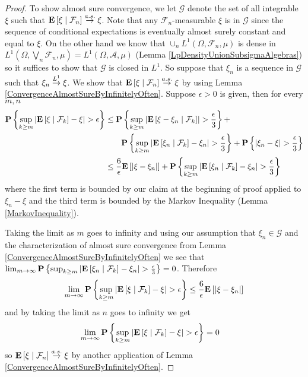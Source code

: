 \begin{proof}
To show almost sure convergence, we let $\mathcal{G}$ denote the set
of all integrable $\xi$ such that
$\cexpectationlong{\mathcal{F}_n}{\xi} \toas \xi$.  Note that any
$\mathcal{F}_n$-measurable $\xi$ is in $\mathcal{G}$ since the sequence
of conditional expectations is eventually almost surely constant and
equal to $\xi$.  On the other hand we know that $\cup_n
L^1(\Omega, \mathcal{F}_n, \mu)$ is dense in $L^1(\Omega, \bigvee_n
  \mathcal{F}_n, \mu) = L^1(\Omega, \mathcal{A}, \mu)$ (Lemma
  \ref{LpDensityUnionSubsigmaAlgebras}) so it suffices to show that
  $\mathcal{G}$ is closed in $L^1$.  So suppose that $\xi_n$ is a
  sequence in $\mathcal{G}$ such that $\xi_n \tolp{1} \xi$.  We show
  that $\cexpectationlong{\mathcal{F}_n}{\xi} \toas \xi$ by using
  Lemma \ref{ConvergenceAlmostSureByInfinitelyOften}.  Suppose
  $\epsilon > 0$ is given, then for every $m,n$
\begin{align*}\begin{split}
\probability{\sup_{k \geq m} \abs{\cexpectationlong{\mathcal{F}_k}{\xi} - \xi} >
  \epsilon} &\leq \probability{\sup_{k \geq m}
  \abs{\cexpectationlong{\mathcal{F}_k}{\xi-\xi_n}} >
  \frac{\epsilon}{3}} + \\
&\qquad \probability{\sup_{k \geq m}
  \abs{\cexpectationlong{\mathcal{F}_k}{\xi_n} - \xi_n} >
  \frac{\epsilon}{3}} + \probability{\abs{\xi_n - \xi} >
  \frac{\epsilon}{3}} \\
&\leq \frac{6}{\epsilon} \expectation{\abs{\xi - \xi_n} } +
\probability{\sup_{k \geq m}
  \abs{\cexpectationlong{\mathcal{F}_k}{\xi_n} - \xi_n} >
  \frac{\epsilon}{3}} \\
\end{split}
\end{align*}
where the first term is bounded by our claim at the beginning of
proof applied to $\xi_n - \xi$ and the third term is
bounded by the Markov Inequality (Lemma
\ref{MarkovInequality}).

Taking the limit as $m$ goes to infinity and using our assumption that
$\xi_n \in \mathcal{G}$ and the characterization of almost sure
convergence from Lemma
\ref{ConvergenceAlmostSureByInfinitelyOften} we see that $\lim_{m \to
  \infty} \probability{\sup_{k \geq m}
  \abs{\cexpectationlong{\mathcal{F}_k}{\xi_n} - \xi_n} >
  \frac{\epsilon}{3}} = 0$.  
Therefore
\begin{align*}
\lim_{m \to \infty} \probability{\sup_{k \geq m} \abs{\cexpectationlong{\mathcal{F}_k}{\xi} - \xi} >
  \epsilon} &\leq \frac{6}{\epsilon} \expectation{\abs{\xi - \xi_n} }
\\
\end{align*}
and by taking the limit as $n$ goes to infinity we get
\begin{align*}
\lim_{m \to \infty} \probability{\sup_{k \geq m} \abs{\cexpectationlong{\mathcal{F}_k}{\xi} - \xi} >
  \epsilon}&=0
\end{align*}
 so $\cexpectationlong{\mathcal{F}_n}{\xi} \toas \xi$ by another application of Lemma \ref{ConvergenceAlmostSureByInfinitelyOften}.


\end{proof}
